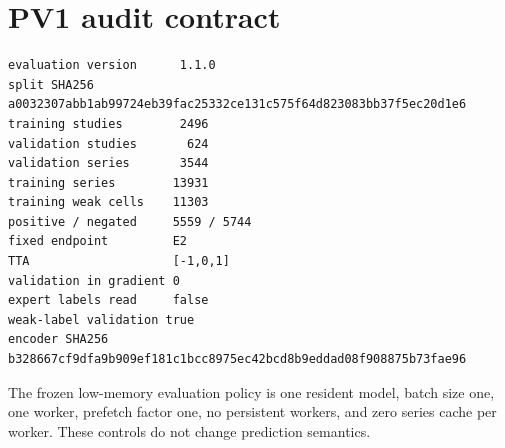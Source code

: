 \documentclass[preprint,12pt]{elsarticle}
\begin{document}
\section{PV1 audit contract}
\label{app:pv1audit}
\begin{verbatim}
evaluation version      1.1.0
split SHA256            a0032307abb1ab99724eb39fac25332ce131c575f64d823083bb37f5ec20d1e6
training studies        2496
validation studies       624
validation series       3544
training series        13931
training weak cells    11303
positive / negated     5559 / 5744
fixed endpoint         E2
TTA                    [-1,0,1]
validation in gradient 0
expert labels read     false
weak-label validation true
encoder SHA256          b328667cf9dfa9b909ef181c1bcc8975ec42bcd8b9eddad08f908875b73fae96
\end{verbatim}

The frozen low-memory evaluation policy is one resident model, batch size one, one worker, prefetch factor one, no persistent workers, and zero series cache per worker. These controls do not change prediction semantics.
\end{document}

